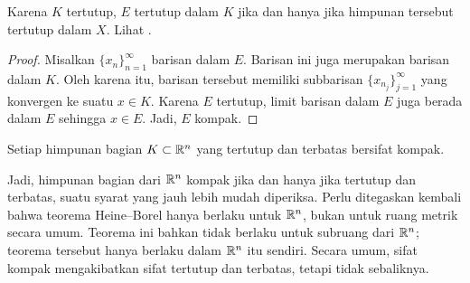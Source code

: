 Karena $K$ tertutup, $E$ tertutup dalam $K$ jika dan
hanya jika himpunan tersebut tertutup dalam $X$.
Lihat .

\begin{proof}
Misalkan $\{ x_n \}_{n=1}^\infty$ barisan dalam $E$.  Barisan ini juga merupakan barisan dalam $K$.
Oleh karena itu, barisan tersebut memiliki subbarisan $\{ x_{n_j} \}_{j=1}^\infty$ yang konvergen ke
suatu $x \in K$.  Karena $E$ tertutup, limit barisan dalam $E$ juga berada dalam $E$
sehingga $x \in E$.  Jadi, $E$ kompak.
\end{proof}

\begin{thm}%
\label{thm:msbw}
Setiap himpunan bagian $K \subset {\mathbb{R}}^n$ yang tertutup dan terbatas bersifat kompak.
\end{thm}

Jadi, himpunan bagian dari ${\mathbb{R}}^n$ kompak jika dan hanya jika tertutup dan terbatas,
suatu syarat yang jauh lebih mudah diperiksa.
Perlu ditegaskan kembali bahwa teorema Heine--Borel hanya berlaku untuk ${\mathbb{R}}^n$, bukan
untuk ruang metrik secara umum.
Teorema ini bahkan tidak berlaku untuk subruang dari ${\mathbb{R}}^n$; teorema tersebut hanya berlaku dalam
${\mathbb{R}}^n$ itu sendiri.
Secara umum, sifat kompak mengakibatkan sifat tertutup dan
terbatas, tetapi tidak sebaliknya.

